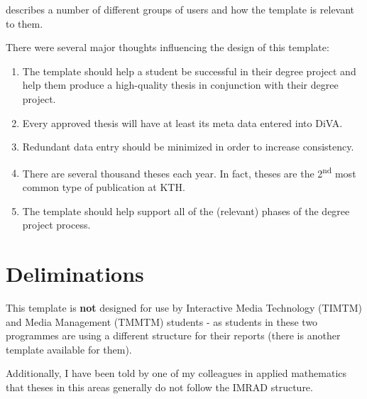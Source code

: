 \documentclass{article}
\begin{document}
 describes a number of different groups of users and how the template is relevant to them.

There were several major thoughts influencing the design of this template:
\begin{enumerate}[leftmargin=*, label=\textbf{Thought \arabic*}, ref={Thought \arabic*}]
    \item \label{thought:helpStudent} The template should help a student be successful in their degree project and help them produce a \mbox{high-quality} thesis in conjunction with their degree project.
    
    \item \label{thought:inDiVA} Every approved thesis will have at least its meta data entered into DiVA.
    
    \item \label{thought:reducingDataEntry} Redundant data entry should be minimized in order to increase consistency.
    
    \item \label{thought:volume} There are several thousand theses each year. In fact, theses are the 2\textsuperscript{nd} most common type of publication at KTH.
    
    \item \label{thought:process} The template should help support all of the (relevant) phases of the degree project process.
\end{enumerate}

\section{Deliminations}

This template is \textbf{not} designed for use by Interactive Media Technology (TIMTM) and Media Management (TMMTM) students - as students in these two programmes are using a different structure for their reports (there is another template available for them).

Additionally, I have been told by one of my colleagues in applied mathematics that theses in this areas generally do not follow the IMRAD structure.
\end{document}
